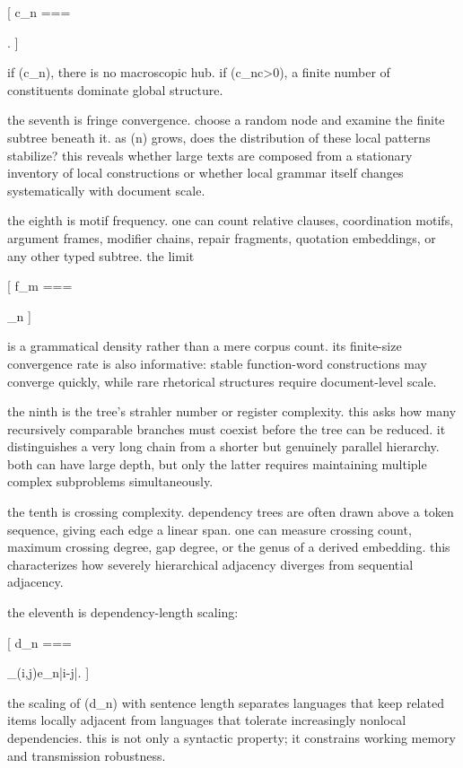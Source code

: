 [
c_n
===

.
]

if (c_n), there is no macroscopic hub. if (c_n\to c>0), a finite number of constituents dominate global structure.

the seventh is fringe convergence. choose a random node and examine the finite subtree beneath it. as (n) grows, does the distribution of these local patterns stabilize? this reveals whether large texts are composed from a stationary inventory of local constructions or whether local grammar itself changes systematically with document scale.

the eighth is motif frequency. one can count relative clauses, coordination motifs, argument frames, modifier chains, repair fragments, quotation embeddings, or any other typed subtree. the limit

[
f_m
===

\lim_{n\to\infty}
]

is a grammatical density rather than a mere corpus count. its finite-size convergence rate is also informative: stable function-word constructions may converge quickly, while rare rhetorical structures require document-level scale.

the ninth is the tree’s strahler number or register complexity. this asks how many recursively comparable branches must coexist before the tree can be reduced. it distinguishes a very long chain from a shorter but genuinely parallel hierarchy. both can have large depth, but only the latter requires maintaining multiple complex subproblems simultaneously.

the tenth is crossing complexity. dependency trees are often drawn above a token sequence, giving each edge a linear span. one can measure crossing count, maximum crossing degree, gap degree, or the genus of a derived embedding. this characterizes how severely hierarchical adjacency diverges from sequential adjacency.

the eleventh is dependency-length scaling:

[
d_n
===

\sum_{(i,j)\in e_n}|i-j|.
]

the scaling of (d_n) with sentence length separates languages that keep related items locally adjacent from languages that tolerate increasingly nonlocal dependencies. this is not only a syntactic property; it constrains working memory and transmission robustness.


